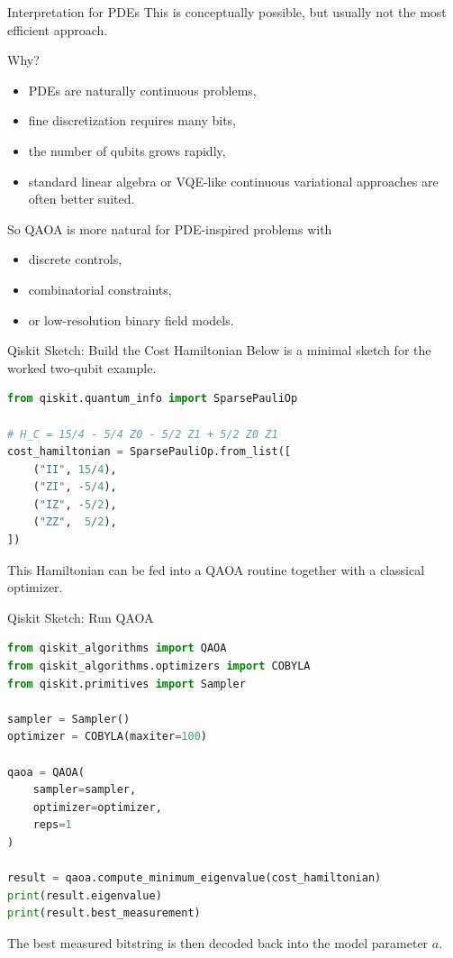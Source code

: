\documentclass{beamer}
\begin{document}
\begin{frame}{Interpretation for PDEs}
This is conceptually possible, but usually not the most efficient approach.

Why?
\begin{itemize}
\item PDEs are naturally continuous problems,
\item fine discretization requires many bits,
\item the number of qubits grows rapidly,
\item standard linear algebra or VQE-like continuous variational approaches are often better suited.
\end{itemize}

So QAOA is more natural for PDE-inspired problems with
\begin{itemize}
\item discrete controls,
\item combinatorial constraints,
\item or low-resolution binary field models.
\end{itemize}
\end{frame}

\begin{frame}{Qiskit Sketch: Build the Cost Hamiltonian}
Below is a minimal sketch for the worked two-qubit example.

\begin{lstlisting}[language=Python]
from qiskit.quantum_info import SparsePauliOp

# H_C = 15/4 - 5/4 Z0 - 5/2 Z1 + 5/2 Z0 Z1
cost_hamiltonian = SparsePauliOp.from_list([
    ("II", 15/4),
    ("ZI", -5/4),
    ("IZ", -5/2),
    ("ZZ",  5/2),
])
\end{lstlisting}

This Hamiltonian can be fed into a QAOA routine together with a classical optimizer.
\end{frame}

\begin{frame}{Qiskit Sketch: Run QAOA}
\begin{lstlisting}[language=Python]
from qiskit_algorithms import QAOA
from qiskit_algorithms.optimizers import COBYLA
from qiskit.primitives import Sampler

sampler = Sampler()
optimizer = COBYLA(maxiter=100)

qaoa = QAOA(
    sampler=sampler,
    optimizer=optimizer,
    reps=1
)

result = qaoa.compute_minimum_eigenvalue(cost_hamiltonian)
print(result.eigenvalue)
print(result.best_measurement)
\end{lstlisting}

The best measured bitstring is then decoded back into the model parameter \(a\).
\end{frame}
\end{document}
